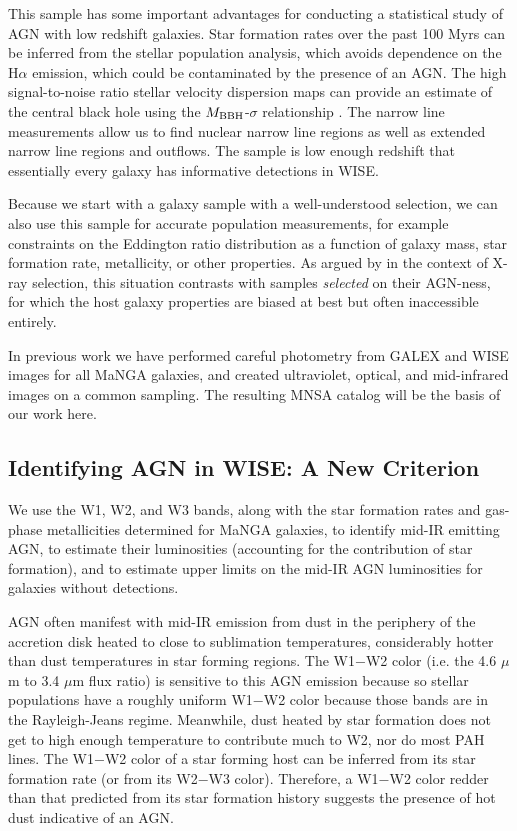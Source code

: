 \documentclass[12pt, preprint]{hacked-aastex}
\begin{document}
This sample has some important advantages for conducting a statistical
study of AGN with low redshift galaxies.  Star formation rates over
the past 100 Myrs can be inferred from the stellar population
analysis, which avoids dependence on the H$\alpha$ emission, which
could be contaminated by the presence of an AGN.  The high
signal-to-noise ratio stellar velocity dispersion maps can provide an
estimate of the central black hole using the $M_{\rm BBH}$-$\sigma$
relationship \cite{kormendy04b}. The narrow line measurements allow us
to find nuclear narrow line regions as well as extended narrow line
regions and outflows. The sample is low enough redshift that
essentially every galaxy has informative detections in WISE.

Because we start with a galaxy sample with a well-understood
selection, we can also use this sample for accurate population
measurements, for example constraints on the Eddington ratio
distribution as a function of galaxy mass, star formation rate,
metallicity, or other properties.  As argued by \cite{aird12a} in the
context of X-ray selection, this situation contrasts with samples {\it
  selected} on their AGN-ness, for which the host galaxy properties
are biased at best but often inaccessible entirely.

In previous work we have performed careful photometry from GALEX and
WISE images for all MaNGA galaxies, and created ultraviolet, optical,
and mid-infrared images on a common sampling. The resulting MNSA
catalog will be the basis of our work here.

\subsection{Identifying AGN in WISE: A New Criterion}
\label{sec:criterion}

We use the W1, W2, and W3 bands, along with the star formation rates
and gas-phase metallicities determined for MaNGA galaxies, to identify
mid-IR emitting AGN, to estimate their luminosities (accounting for
the contribution of star formation), and to estimate upper limits on
the mid-IR AGN luminosities for galaxies without detections.

AGN often manifest with mid-IR emission from dust in the periphery of
the accretion disk heated to close to sublimation temperatures,
considerably hotter than dust temperatures in star forming regions.
The W1$-$W2 color (i.e. the 4.6 $\mu$m to 3.4 $\mu$m flux ratio) is
sensitive to this AGN emission because so stellar populations have a
roughly uniform W1$-$W2 color because those bands are in the
Rayleigh-Jeans regime.  Meanwhile, dust heated by star formation does
not get to high enough temperature to contribute much to W2, nor do
most PAH lines.  The W1$-$W2 color of a star forming host can be
inferred from its star formation rate (or from its W2$-$W3 color).
Therefore, a W1$-$W2 color redder than that predicted from its star
formation history suggests the presence of hot dust indicative of an
AGN.
\end{document}
